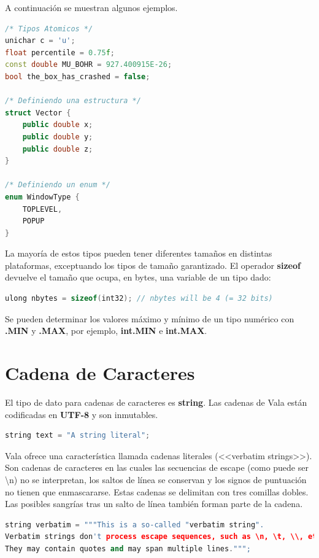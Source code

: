 \documentclass[12pt,twoside]{book}
\begin{document}
A continuación se muestran algunos ejemplos.

\begin{lstlisting}[language=C++]
/* Tipos Atomicos */
unichar c = 'u';
float percentile = 0.75f;
const double MU_BOHR = 927.400915E-26;
bool the_box_has_crashed = false;

/* Definiendo una estructura */
struct Vector {
	public double x;
	public double y;
	public double z;
}

/* Definiendo un enum */
enum WindowType {
	TOPLEVEL,
	POPUP
}
\end{lstlisting}

La mayoría de estos tipos pueden tener diferentes tamaños en distintas plataformas, exceptuando los tipos de tamaño garantizado. El operador \textbf{sizeof} devuelve el tamaño que ocupa, en bytes, una variable de un tipo dado:

\begin{lstlisting}[language=C++]
ulong nbytes = sizeof(int32); // nbytes will be 4 (= 32 bits)
\end{lstlisting}

Se pueden determinar los valores máximo y mínimo de un tipo numérico con \textbf{.MIN} y \textbf{.MAX}, por ejemplo, \textbf{int.MIN} e \textbf{int.MAX}.

\section{Cadena de Caracteres}

El tipo de dato para cadenas de caracteres es \textbf{string}. Las cadenas de Vala están codificadas en \textbf{UTF-8} y son inmutables.

\begin{lstlisting}[language=C++]
string text = "A string literal";
\end{lstlisting}

Vala ofrece una característica llamada cadenas literales (<<verbatim strings>>). Son cadenas de caracteres en las cuales las secuencias de escape (como puede ser \textbackslash n) no se interpretan, los saltos de línea se conservan y los signos de puntuación no tienen que enmascararse. Estas cadenas se delimitan con tres comillas dobles. Las posibles sangrías tras un salto de línea también forman parte de la cadena.

\begin{lstlisting}[language=C++]
string verbatim = """This is a so-called "verbatim string".
Verbatim strings don't process escape sequences, such as \n, \t, \\, etc.
They may contain quotes and may span multiple lines.""";
\end{lstlisting}
\end{document}
